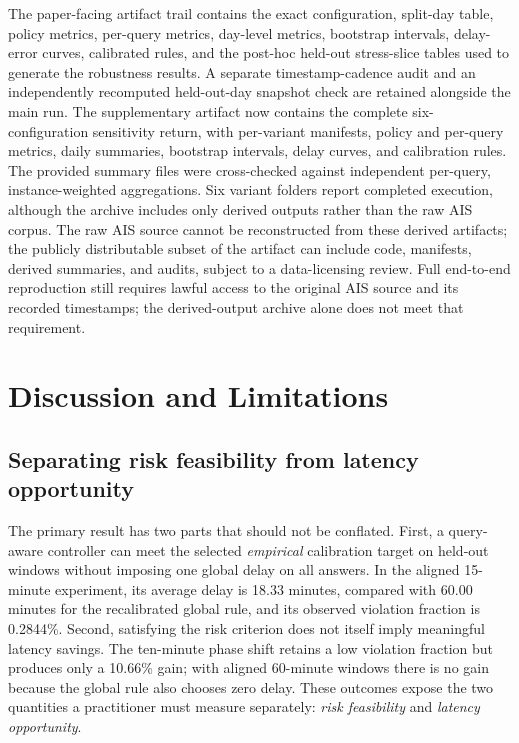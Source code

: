 \documentclass[conference]{IEEEtran}
\begin{document}
The paper-facing artifact trail contains the exact configuration, split-day table, policy metrics, per-query metrics, day-level metrics, bootstrap intervals, delay-error curves, calibrated rules, and the post-hoc held-out stress-slice tables used to generate the robustness results. A separate timestamp-cadence audit and an independently recomputed held-out-day snapshot check are retained alongside the main run. The supplementary artifact now contains the complete six-configuration sensitivity return, with per-variant manifests, policy and per-query metrics, daily summaries, bootstrap intervals, delay curves, and calibration rules. The provided summary files were cross-checked against independent per-query, instance-weighted aggregations. Six variant folders report completed execution, although the archive includes only derived outputs rather than the raw AIS corpus. The raw AIS source cannot be reconstructed from these derived artifacts; the publicly distributable subset of the artifact can include code, manifests, derived summaries, and audits, subject to a data-licensing review. Full end-to-end reproduction still requires lawful access to the original AIS source and its recorded timestamps; the derived-output archive alone does not meet that requirement.

\section{Discussion and Limitations}
\subsection{Separating risk feasibility from latency opportunity}
The primary result has two parts that should not be conflated. First, a query-aware controller can meet the selected \emph{empirical} calibration target on held-out windows without imposing one global delay on all answers. In the aligned 15-minute experiment, its average delay is 18.33 minutes, compared with 60.00 minutes for the recalibrated global rule, and its observed violation fraction is 0.2844\%. Second, satisfying the risk criterion does not itself imply meaningful latency savings. The ten-minute phase shift retains a low violation fraction but produces only a 10.66\% gain; with aligned 60-minute windows there is no gain because the global rule also chooses zero delay. These outcomes expose the two quantities a practitioner must measure separately: \emph{risk feasibility} and \emph{latency opportunity}.
\end{document}
